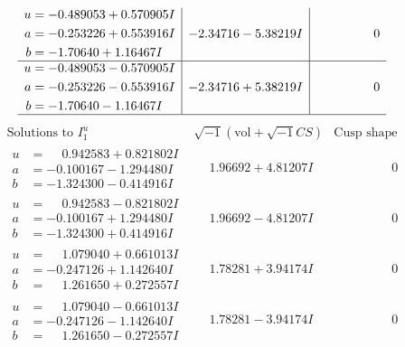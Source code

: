\documentclass[1p]{elsarticle_modified}
\theoremstyle{definition}
\newcommand{\I}{\sqrt{-1}}
\begin{document}
$$\begin{array}{c|c|c}
\begin{aligned}
u &= -0.489053 + 0.570905 I \\
a &= -0.253226 + 0.553916 I \\
b &= -1.70640 + 1.16467 I\end{aligned}
 & -2.34716 - 5.38219 I & \phantom{-0.000000 } 0 \\ \hline\begin{aligned}
u &= -0.489053 - 0.570905 I \\
a &= -0.253226 - 0.553916 I \\
b &= -1.70640 - 1.16467 I\end{aligned}
 & -2.34716 + 5.38219 I & \phantom{-0.000000 } 0\\
 \hline 
 \end{array}$$\newpage$$\begin{array}{c|c|c}  
\text{Solutions to }I^u_{1}& \I (\text{vol} + \sqrt{-1}CS) & \text{Cusp shape}\\
 \hline 
\begin{aligned}
u &= \phantom{-}0.942583 + 0.821802 I \\
a &= -0.100167 - 1.294480 I \\
b &= -1.324300 - 0.414916 I\end{aligned}
 & \phantom{-}1.96692 + 4.81207 I & \phantom{-0.000000 } 0 \\ \hline\begin{aligned}
u &= \phantom{-}0.942583 - 0.821802 I \\
a &= -0.100167 + 1.294480 I \\
b &= -1.324300 + 0.414916 I\end{aligned}
 & \phantom{-}1.96692 - 4.81207 I & \phantom{-0.000000 } 0 \\ \hline\begin{aligned}
u &= \phantom{-}1.079040 + 0.661013 I \\
a &= -0.247126 + 1.142640 I \\
b &= \phantom{-}1.261650 + 0.272557 I\end{aligned}
 & \phantom{-}1.78281 + 3.94174 I & \phantom{-0.000000 } 0 \\ \hline\begin{aligned}
u &= \phantom{-}1.079040 - 0.661013 I \\
a &= -0.247126 - 1.142640 I \\
b &= \phantom{-}1.261650 - 0.272557 I\end{aligned}
 & \phantom{-}1.78281 - 3.94174 I & \phantom{-0.000000 } 0 \\ \hline\begin{aligned}

\end{aligned}
\end{array}$$
\end{document}
